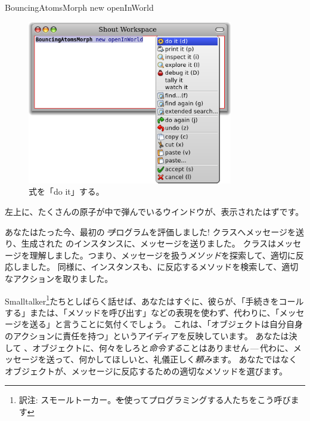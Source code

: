 \documentclass[a4paper,10pt,twoside]{book}
\begin{document}

\begin{code}{}
BouncingAtomsMorph new openInWorld
\end{code}


\begin{figure}[htb]
\centerline {\includegraphics[width=0.8\textwidth]{Doit}}
\caption{式を「do it」する。}
\end{figure}

左上に、たくさんの原子が中で弾んでいるウインドウが、表示されたはずです。

あなたはたった今、最初の \st プログラムを評価しました!
\bam クラスへメッセージを送り、生成された \bam のインスタンスに、メッセージを送りました。
\bam クラスはメッセージを理解しました。つまり、メッセージを扱う\emph{メソッド}を探索して、適切に反応しました。
同様に、\bam インスタンスも、に反応するメソッドを検索して、適切なアクションを取りました。

Smalltalker\footnote{訳注: スモールトーカー。\st を使ってプログラミングする人たちをこう呼びます}たちとしばらく話せば、あなたはすぐに、彼らが、「手続きをコールする」または、「メソッドを呼び出す」などの表現を使わず、代わりに、「メッセージを送る」と言うことに気付くでしょう。
これは、「オブジェクトは自分自身のアクションに責任を持つ」というアイディアを反映しています。
あなたは決して 、オブジェクトに、何々をしろと\emph{命令する}ことはありません\,---\,代わに、メッセージを送って、何かしてほしいと、礼儀正しく\emph{頼み}ます。
あなたではなくオブジェクトが、メッセージに反応するための適切なメソッドを選びます。
\end{document}
